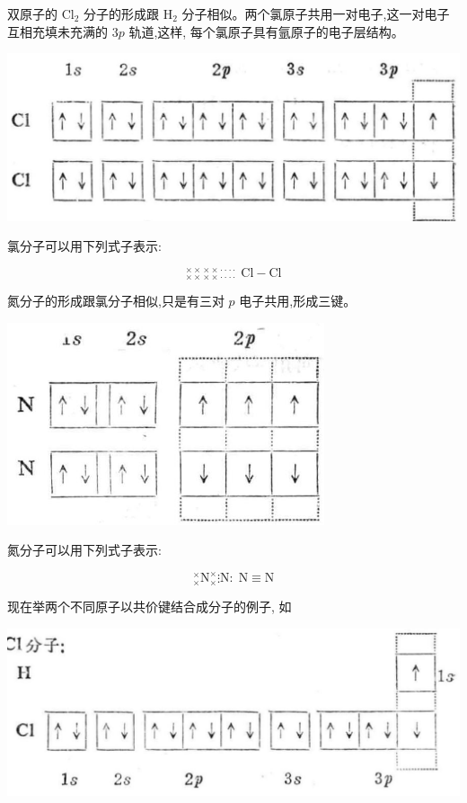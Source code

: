 \documentclass[10pt]{article}
\begin{document}
双原子的 \({\mathrm{{Cl}}}_{2}\) 分子的形成跟 \({\mathrm{H}}_{2}\) 分子相似。两个氯原子共用一对电子,这一对电子互相充填未充满的 \({3p}\) 轨道,这样, 每个氯原子具有氩原子的电子层结构。

\begin{center}
\includegraphics[max width=1.0\textwidth]{images/01912d13-9986-7822-a012-3f3f7be99dcb_14_931588.jpg}
\end{center}

氯分子可以用下列式子表示:

\[
{}_{\times \times }^{\times \times }{}_{\times \times }^{\times \times }{}_{\cdot \cdot }^{\cdot \cdot }{}_{\cdot \cdot }^{\cdot \cdot }\;\mathrm{{Cl}} - \mathrm{{Cl}}
\]

氮分子的形成跟氯分子相似,只是有三对 \(p\) 电子共用,形成三键。

\begin{center}
\includegraphics[max width=0.7\textwidth]{images/01912d13-9986-7822-a012-3f3f7be99dcb_14_219593.jpg}
\end{center}

氮分子可以用下列式子表示:

\[
{}_{ \times }^{ \times }{\mathrm{N}}_{ \times }^{ \times }\vdots \mathrm{N} : \;\mathrm{N} \equiv \mathrm{N}
\]

现在举两个不同原子以共价键结合成分子的例子, 如

\begin{center}
\includegraphics[max width=1.0\textwidth]{images/01912d13-9986-7822-a012-3f3f7be99dcb_14_721329.jpg}
\end{center}
\end{document}
